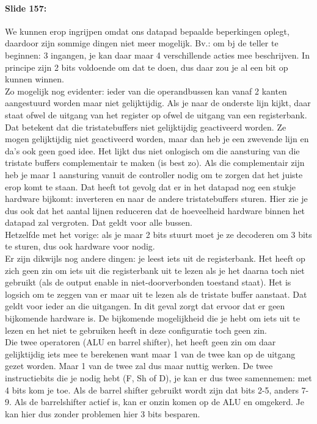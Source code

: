 \documentclass[10pt,a4paper]{book}
\begin{document}
\paragraph{Slide 157:} We kunnen erop ingrijpen omdat ons datapad bepaalde beperkingen oplegt, daardoor zijn sommige dingen niet meer mogelijk. Bv.: om bj de teller te beginnen: 3 ingangen, je kan daar maar 4 verschillende acties mee beschrijven. In principe zijn 2 bits voldoende om dat te doen, dus daar zou je al een bit op kunnen winnen.\\
Zo mogelijk nog evidenter: ieder van die operandbussen kan vanaf 2 kanten aangestuurd worden maar niet gelijktijdig. Als je naar de onderste lijn kijkt, daar staat ofwel de uitgang van het register op ofwel de uitgang van een registerbank. Dat betekent dat die tristatebuffers niet gelijktijdig geactiveerd worden. Ze mogen gelijktijdig niet geactiveerd worden, maar dan heb je een zwevende lijn en da's ook geen goed idee. Het lijkt dus niet onlogisch om die aansturing van die tristate buffers complementair te maken (is best zo). Als die complementair zijn heb je maar 1 aansturing vanuit de controller nodig om te zorgen dat het juiste erop komt te staan. Dat heeft tot gevolg dat er in het datapad nog een stukje hardware bijkomt: inverteren en naar de andere tristatebuffers sturen. Hier zie je dus ook dat het aantal lijnen %
 reduceren dat de hoeveelheid hardware binnen het datapad zal vergroten. Dat geldt voor alle bussen.\\
Hetzelfde met het vorige: als je maar 2 bits stuurt moet je ze decoderen om 3 bits te sturen, dus ook hardware voor nodig.\\
Er zijn dikwijls nog andere dingen: je leest iets uit de registerbank. Het heeft op zich geen zin om iets uit die registerbank uit te lezen als je het daarna toch niet gebruikt (als de output enable in niet-doorverbonden toestand staat). Het is logsich om te zeggen van er maar uit te lezen als de tristate buffer aanstaat. Dat geldt voor ieder an die uitgangen. In dit geval zorgt dat ervoor dat er geen bijkomende hardware is. De bijkomende mogelijkheid die je hebt om iets uit te lezen en het niet te gebruiken heeft in deze configuratie toch geen zin.\\
Die twee operatoren (ALU en barrel shifter), het heeft geen zin om daar gelijktijdig iets mee te berekenen want maar 1 van de twee kan op de uitgang gezet worden. Maar 1 van de twee zal dus maar nuttig werken. De twee instructiebits die je nodig hebt (F, Sh of D), je kan er dus twee samennemen: met 4 bits kom je toe. Als de barrel shifter gebruikt wordt zijn dat bits 2-5, anders 7-9. Als de barrelshifter actief is, kan er onzin komen op de ALU en omgekerd. Je kan hier dus zonder problemen hier 3 bits besparen.
\end{document}
